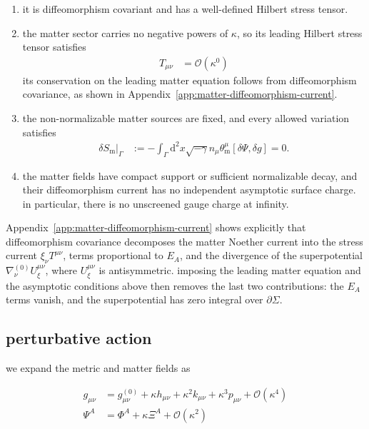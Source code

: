 \begin{enumerate}
\def\labelenumi{\arabic{enumi}.}
\tightlist
\item
  it is diffeomorphism covariant and has a well-defined Hilbert stress tensor.
\item
  the matter sector carries no negative powers of $\displaystyle{\kappa}$, so its leading Hilbert stress tensor satisfies\begin{align}T_{\mu \nu} & =\mathcal{O}(\kappa^{0})\end{align}its conservation on the leading matter equation follows from diffeomorphism covariance, as shown in Appendix~\ref{app:matter-diffeomorphism-current}.
\item
  the non-normalizable matter sources are fixed, and every allowed variation satisfies\begin{align}\left.\delta S_{\mathrm{m}}\right|_{\Gamma} &:=-\int _{\Gamma}\mathrm{d}^{2}x\sqrt{-\gamma} n_{\mu}\theta _{\mathrm{m}}^{\mu}[\delta\Psi,\delta g]=0.\end{align}
\item
  the matter fields have compact support or sufficient normalizable decay, and their diffeomorphism current has no independent asymptotic surface charge. in particular, there is no unscreened gauge charge at infinity.
\end{enumerate}

Appendix~\ref{app:matter-diffeomorphism-current} shows explicitly that diffeomorphism covariance decomposes the matter Noether current into the stress current $\displaystyle{\xi _{\nu}T^{\mu \nu}}$, terms proportional to $\displaystyle{E_{A}}$, and the divergence of the superpotential $\displaystyle{\nabla _{\nu}^{(0)}U^{\mu \nu}_{\xi}}$, where $\displaystyle{U_{\xi}^{\mu \nu}}$ is antisymmetric. imposing the leading matter equation and the asymptotic conditions above then removes the last two contributions: the $\displaystyle{E_{A}}$ terms vanish, and the superpotential has zero integral over $\displaystyle{\partial\Sigma}$.

\subsection{perturbative action}\label{subsec:perturbative-action}

we expand the metric and matter fields as

\begin{align}
g_{\mu \nu} & =g^{(0)}_{\mu \nu}+\kappa h_{\mu \nu}+\kappa ^{2}k _{\mu \nu}+\kappa ^{3}p_{\mu \nu}+\mathcal{O}(\kappa ^{4}) \\
\Psi^{A} & =\Phi ^{A}+\kappa \Xi^{A}+\mathcal{O}(\kappa ^{2})
\end{align}

